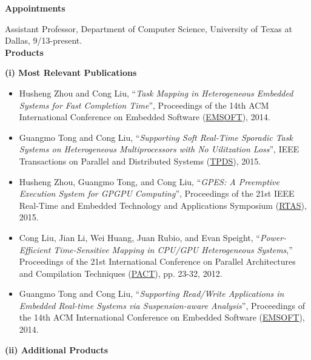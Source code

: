 \documentclass[10pt,letterpaper]{article}
\begin{document}
\noindent \textbf{Appointments}\

	\hspace{1mm} Assistant Professor, Department of Computer Science, University of Texas at Dallas, 9/13-present. \\
	
\noindent \textbf{Products} 

\hspace{-4mm} \textbf{(i) Most Relevant Publications}\  
	\vspace{-1mm}
	\begin{itemize}

\item 
Husheng Zhou and Cong Liu, ``\textit{Task Mapping in Heterogeneous Embedded Systems for Fast Completion Time}'', Proceedings of the 14th ACM International Conference on Embedded Software (\underline{EMSOFT}), 2014.

\item
Guangmo Tong and Cong Liu, ``\textit{Supporting Soft Real-Time Sporadic Task Systems on Heterogeneous Multiprocessors with No Uilitzation Loss}'', IEEE Transactions on Parallel and Distributed Systems (\underline{TPDS}), 2015.

	
\item
Husheng Zhou, Guangmo Tong, and Cong Liu, ``\textit{GPES: A Preemptive Execution System for GPGPU Computing}'', Proceedings of the 21st IEEE Real-Time and Embedded Technology and Applications Symposium (\underline{RTAS}), 2015.


\item  	Cong Liu, Jian Li, Wei Huang, Juan Rubio, and Evan Speight, ``\textit{Power-Efficient Time-Sensitive Mapping in CPU/GPU Heterogeneous Systems},'' Proceedings of the 21st International Conference on Parallel Architectures and Compilation Techniques (\underline{PACT}), pp. 23-32, 2012.

\item Guangmo Tong and Cong Liu, ``\textit{Supporting Read/Write Applications in Embedded Real-time Systems via Suspension-aware Analysis}'', Proceedings of the 14th ACM International Conference on Embedded Software (\underline{EMSOFT}), 2014.





\end{itemize}
\hspace{-4mm} \textbf{(ii) Additional Products}\  
\vspace{-1mm}
\end{document}
